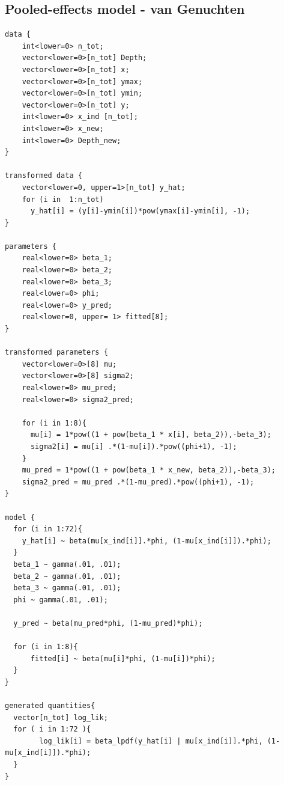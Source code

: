 \documentclass{article}
\begin{document}
\subsection*{Pooled-effects model - van Genuchten}
\begin{lstlisting}
data {
    int<lower=0> n_tot;
    vector<lower=0>[n_tot] Depth;
    vector<lower=0>[n_tot] x;
    vector<lower=0>[n_tot] ymax;
    vector<lower=0>[n_tot] ymin;
    vector<lower=0>[n_tot] y;
    int<lower=0> x_ind [n_tot];
    int<lower=0> x_new;
    int<lower=0> Depth_new;
}

transformed data {
    vector<lower=0, upper=1>[n_tot] y_hat;
    for (i in  1:n_tot)
      y_hat[i] = (y[i]-ymin[i])*pow(ymax[i]-ymin[i], -1);
}

parameters {
    real<lower=0> beta_1;
    real<lower=0> beta_2;
    real<lower=0> beta_3;
    real<lower=0> phi;
    real<lower=0> y_pred;
    real<lower=0, upper= 1> fitted[8];
}

transformed parameters {
    vector<lower=0>[8] mu;
    vector<lower=0>[8] sigma2;
    real<lower=0> mu_pred;
    real<lower=0> sigma2_pred;
    
    for (i in 1:8){
      mu[i] = 1*pow((1 + pow(beta_1 * x[i], beta_2)),-beta_3);
      sigma2[i] = mu[i] .*(1-mu[i]).*pow((phi+1), -1);
    }
    mu_pred = 1*pow((1 + pow(beta_1 * x_new, beta_2)),-beta_3);
    sigma2_pred = mu_pred .*(1-mu_pred).*pow((phi+1), -1);
}

model {
  for (i in 1:72){
    y_hat[i] ~ beta(mu[x_ind[i]].*phi, (1-mu[x_ind[i]]).*phi);
  }
  beta_1 ~ gamma(.01, .01);
  beta_2 ~ gamma(.01, .01);
  beta_3 ~ gamma(.01, .01);
  phi ~ gamma(.01, .01);
  
  y_pred ~ beta(mu_pred*phi, (1-mu_pred)*phi);
  
  for (i in 1:8){
      fitted[i] ~ beta(mu[i]*phi, (1-mu[i])*phi);
  }
}

generated quantities{
  vector[n_tot] log_lik;
  for ( i in 1:72 ){
        log_lik[i] = beta_lpdf(y_hat[i] | mu[x_ind[i]].*phi, (1-mu[x_ind[i]]).*phi);
  }
}
\end{lstlisting}




\end{document}
